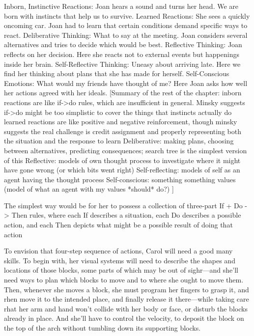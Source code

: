 \documentclass[10pt,a4paper]{article}
\begin{document}
Inborn, Instinctive Reactions: Joan hears a sound and turns her head. We are born with instincts that help us to survive.
Learned Reactions: She sees a quickly oncoming car. Joan had to learn that certain conditions demand specific ways to react.
Deliberative Thinking: What to say at the meeting. Joan considers several alternatives and tries to decide which would be best.
Reflective Thinking: Joan reflects on her decision. Here she reacts not to external events but happenings inside her brain.
Self-Reflective Thinking: Uneasy about arriving late. Here we find her thinking about plans that she has made for herself.
Self-Conscious Emotions: What would my friends have thought of me? Here Joan asks how well her actions agreed with her ideals. \cite[p.~130-131]{minsky}
[Summary of the rest of the chapter:
inborn reactions are like if->do rules, which are insufficient in general. Minsky suggests if->do might be too simplistic to cover the things that instincts actually do 
learned reactions are like positive and negative reinforcement, though minsky suggests the real challenge is credit assignment and properly representing both the situation and the response to learn
Deliberative: making plans, choosing between alternatives, predicting consequences; search tree is the simplest version of this
Reflective: models of own thought process to investigate where it might have gone wrong (or which bits went right)
Self-reflecting: models of self as an agent having the thought process
Self-conscious: something something values (model of what an agent with my values *should* do?)
]

The simplest way would be for her to possess a collection of three-part If + Do -> Then rules, where each
If describes a situation, each Do describes a possible action, and each Then depicts what might be a possible result of doing that action  \cite[p.~135]{minsky}

To envision that four-step sequence of actions, Carol will need a good many skills. To begin with, her visual systems will need to describe the shapes and locations of those blocks, some parts of which may be out of sighr—and she'll need ways to plan which blocks to move and to where she ought to move them. Then, whenever she moves a block, she must program her fingers to grasp it, and rhen move it to the intended place, and finally release it there—while taking care rhat her arm and hand won't collide with her body or face, or disturb the blocks already in place. And she'll have to control the velocity, to deposit the block on the top of the arch without tumbling down its supporting blocks. \cite[p.~136-137]{minsky}
\end{document}
